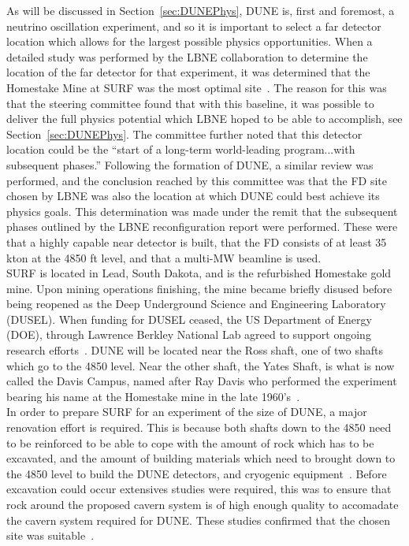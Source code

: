 As will be discussed in Section~\ref{sec:DUNEPhys}, DUNE is, first and foremost, a neutrino oscillation experiment, and so it is important to select a far detector location which allows for the largest possible physics opportunities. When a detailed study was performed by the LBNE collaboration to determine the location of the far detector for that experiment, it was determined that the Homestake Mine at SURF was the most optimal site~\citep{LBNEReconfig}. The reason for this was that the steering committee found that with this baseline, it was possible to deliver the full physics potential which LBNE hoped to be able to accomplish, see Section~\ref{sec:DUNEPhys}. The committee further noted that this detector location could be the ``start of a long-term world-leading program...with subsequent phases.'' Following the formation of DUNE, a similar review was performed, and the conclusion reached by this committee was that the FD site chosen by LBNE was also the location at which DUNE could best achieve its physics goals. This determination was made under the remit that the subsequent phases outlined by the LBNE reconfiguration report were performed. These were that a highly capable near detector is built, that the FD consists of at least 35 kton at the 4850 ft level, and that a multi-MW beamline is used. \\

SURF is located in Lead, South Dakota, and is the refurbished Homestake gold mine. Upon mining operations finishing, the mine became briefly disused before being reopened as the Deep Underground Science and Engineering Laboratory (DUSEL). When funding for DUSEL ceased, the US Department of Energy (DOE), through Lawrence Berkley National Lab agreed to support ongoing research efforts~\citep{SURFWebsite}. DUNE will be located near the Ross shaft, one of two shafts which go to the 4850 level. Near the other shaft, the Yates Shaft, is what is now called the Davis Campus, named after Ray Davis who performed the experiment bearing his name at the Homestake mine in the late 1960's~\citep{RayDavis1968, RayDavis1988}. \\

In order to prepare SURF for an experiment of the size of DUNE, a major renovation effort is required. This is because both shafts down to the 4850 need to be reinforced to be able to cope with the amount of rock which has to be excavated, and the amount of building materials which need to brought down to the 4850 level to build the DUNE detectors, and cryogenic equipment~\citep{DUNECDR_V3}. Before excavation could occur extensives studies were required, this was to ensure that rock around the proposed cavern system is of high enough quality to accomadate the cavern system required for DUNE. These studies confirmed that the chosen site was suitable~\citep{DUNECDR_V3}. \\


